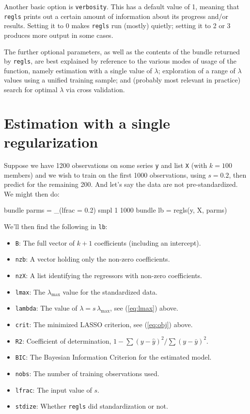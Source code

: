 \documentclass{article}
\begin{document}
Another basic option is \texttt{verbosity}. This has a default value
of 1, meaning that \texttt{regls} prints out a certain amount of
information about its progress and/or results. Setting it to 0 makes
\texttt{regls} run (mostly) quietly; setting it to 2 or 3 produces
more output in some cases.

The further optional parameters, as well as the contents of the bundle
returned by \texttt{regls}, are best explained by reference to the
various modes of usage of the function, namely estimation with a
single value of $\lambda$; exploration of a range of $\lambda$ values
using a unified training sample; and (probably most relevant in
practice) search for optimal $\lambda$ via cross validation.

\section{Estimation with a single regularization}
\label{sec:single-lambda}

Suppose we have 1200 observations on some series \texttt{y} and list
\texttt{X} (with $k=100$ members) and we wish to train on the first
1000 observations, using $s = 0.2$, then predict for the remaining
200. And let's say the data are not pre-standardized. We might then
do:
\begin{code}
bundle parms = _(lfrac = 0.2)
smpl 1 1000
bundle lb = regls(y, X, parms)
\end{code}
We'll then find the following in \texttt{lb}:
\begin{itemize}
\item \texttt{B}: The full vector of $k+1$ coefficients (including an
  intercept).
\item \texttt{nzb}: A vector holding only the non-zero coefficients.
\item \texttt{nzX}: A list identifying the regressors with non-zero
  coefficients.
\item \texttt{lmax}: The $\lambda_{\max}$ value for the standardized
  data.
\item \texttt{lambda}: The value of $\lambda = s\,\lambda_{\max}$, see
  (\ref{eq:lmax}) above.
\item \texttt{crit}: The minimized LASSO criterion, see (\ref{eq:obj})
  above.
\item \texttt{R2}: Coefficient of determination,
  $1 - \sum(y-\hat{y})^2/\sum(y-\bar{y})^2$.
\item \texttt{BIC}: The Bayesian Information Criterion for the
  estimated model.
\item \texttt{nobs}: The number of training observations used.
\item \texttt{lfrac}: The input value of $s$.
\item \texttt{stdize}: Whether \texttt{regls} did standardization or
  not.
\end{itemize}
\end{document}
